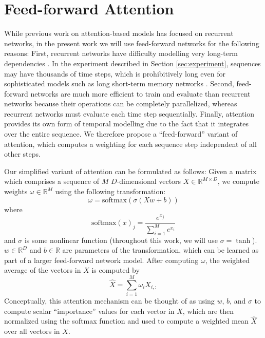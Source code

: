 \documentclass{article}
\begin{document}
\section{Feed-forward Attention}
\label{sec:model}

While previous work on attention-based models has focused on recurrent networks, in the present work we will use feed-forward networks for the following reasons:
First, recurrent networks have difficulty modelling very long-term dependencies \cite{bengio1994learning}.
In the experiment described in Section \ref{sec:experiment}, sequences may have thousands of time steps, which is prohibitively long even for sophisticated models such as long short-term memory networks \cite{hochreiter1997long}.
Second, feed-forward networks are much more efficient to train and evaluate than recurrent networks because their operations can be completely parallelized, whereas recurrent networks must evaluate each time step sequentially.
Finally, attention provides its own form of temporal modelling due to the fact that it integrates over the entire sequence.
We therefore propose a ``feed-forward'' variant of attention, which computes a weighting for each sequence step independent of all other steps.

Our simplified variant of attention can be formulated as follows:
Given a matrix which comprises a sequence of $M$ $D$-dimensional vectors $X \in \mathbb{R}^{M \times D}$, we compute weights $\omega \in \mathbb{R}^M$ using the following transformation:
\begin{equation}
\label{eq:omega}
\omega = \mathrm{softmax}(\sigma(Xw + b))
\end{equation}
where
$$
\mathrm{softmax}(x)_j = \frac{e^{x_j}}{\sum_{i = 1}^M e^{x_i}}
$$
and $\sigma$ is some nonlinear function (throughout this work, we will use $\sigma = \tanh$).
$w \in \mathbb{R}^D$ and $b \in \mathbb{R}$ are parameters of the transformation, which can be learned as part of a larger feed-forward network model.
After computing $\omega$, the weighted average of the vectors in $X$ is computed by
$$
\hat{X} = \sum_{i = 1}^M \omega_i X_{i, :}
$$
Conceptually, this attention mechanism can be thought of as using $w$, $b$, and $\sigma$ to compute scalar ``importance'' values for each vector in $X$, which are then normalized using the softmax function and used to compute a weighted mean $\hat{X}$ over all vectors in $X$.
\end{document}
